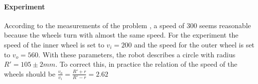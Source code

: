 \documentclass[paper=a4, fontsize=11pt]{scrartcl} %
\begin{document}
\paragraph{Experiment}
According to the measurements of the problem , a speed of 300
seems reasonable because the wheels turn with almost the same speed. For the
experiment the speed of the inner wheel is set to $ v_i = 200 $ and the speed
for the outer wheel is set to $ v_o = 560 $. With these parameters, the robot
describes a circle with radius $ R' = 105 \pm 2 mm $. To correct this, in
practice the relation of the speed of the wheels should be $ \frac{v_o}{v_i}
= \frac{R' + r}{R' - r} = 2.62 $
\end{document}

